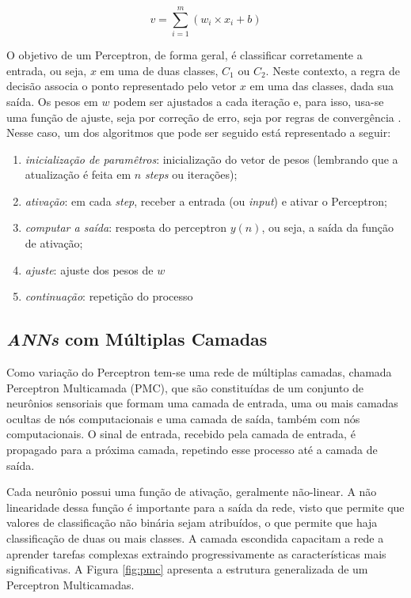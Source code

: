 \begin{equation}
v = \sum_{i=1}^{m} ({w_i} \times {x_i} + b)
\label{eq:funcperceptron}
\end{equation}

O objetivo de um Perceptron, de forma geral, é classificar corretamente a entrada, ou seja, $x$ em uma de duas classes, $C_1$ ou $C_2$. Neste contexto, a regra de decisão associa o ponto representado pelo vetor $x$ em uma das classes, dada sua saída. Os pesos em $w$ podem ser ajustados a cada iteração e, para isso, usa-se uma função de ajuste, seja por correção de erro, seja por regras de convergência . Nesse caso, um dos algoritmos que pode ser seguido está representado a seguir:
\begin{enumerate}
	\item \textit{inicialização de paramêtros}: inicialização do vetor de pesos (lembrando que a atualização é feita em $n$ \textit{steps} ou iterações);
	\item \textit{ativação}: em cada \textit{step}, receber a entrada (ou \textit{input}) e ativar o Perceptron;
	\item \textit{computar a saída}: resposta do perceptron $y(n)$, ou seja, a saída da função de ativação;
	\item \textit{ajuste}: ajuste dos pesos de $w$ 
	\item \textit{continuação}: repetição do processo	 
\end{enumerate}

\subsection{\textit{ANNs} com Múltiplas Camadas}



Como variação do Perceptron tem-se uma rede de múltiplas camadas, chamada Perceptron Multicamada (PMC), que são constituídas de um conjunto de neurônios sensoriais que formam uma camada de entrada, uma ou mais camadas ocultas de nós computacionais e uma camada de saída, também com nós computacionais. O sinal de entrada, recebido pela camada de entrada, é propagado para a próxima camada, repetindo esse processo até a camada de saída. 

Cada neurônio possui uma função de ativação, geralmente não-linear. A não linearidade dessa função é importante para a saída da rede, visto que permite que valores de classificação não binária sejam atribuídos, o que permite que haja classificação de duas ou mais classes. A camada escondida capacitam a rede a aprender tarefas complexas extraindo progressivamente as características mais significativas. A Figura \ref{fig:pmc} apresenta a estrutura generalizada de um Perceptron Multicamadas. 

